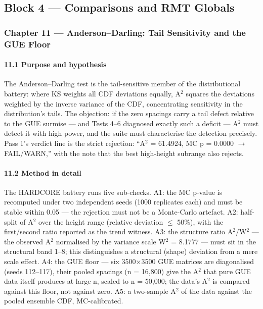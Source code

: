 \documentclass[10pt]{article}
\begin{document}
\subsection{Block 4 --- Comparisons and RMT Globals}

\subsubsection{Chapter 11 --- Anderson--Darling: Tail Sensitivity and the GUE Floor}

\paragraph{11.1 Purpose and hypothesis}

The Anderson--Darling test is the tail-sensitive member of the distributional battery: where KS weights all CDF deviations equally, A$^2$ squares the deviations weighted by the inverse variance of the CDF, concentrating sensitivity in the distribution's tails. The objection: if the zero spacings carry a tail defect relative to the GUE surmise --- and Tests 4--6 diagnosed exactly such a deficit --- A$^2$ must detect it with high power, and the suite must characterise the detection precisely. Pass 1's verdict line is the strict rejection: ``A$^2$ = 61.4924, MC p = 0.0000 $\rightarrow$ FAIL/WARN,'' with the note that the best high-height subrange also rejects.

\paragraph{11.2 Method in detail}

The HARDCORE battery runs five sub-checks. A1: the MC p-value is recomputed under two independent seeds (1000 replicates each) and must be stable within 0.05 --- the rejection must not be a Monte-Carlo artefact. A2: half-split of A$^2$ over the height range (relative deviation $\le$ 50\%), with the first/second ratio reported as the trend witness. A3: the structure ratio A$^2$/W$^2$ --- the observed A$^2$ normalised by the variance scale W$^2$ = 8.1777 --- must sit in the structural band 1--8; this distinguishes a structural (shape) deviation from a mere scale effect. A4: the GUE floor --- six 3500$\times$3500 GUE matrices are diagonalised (seeds 112--117), their pooled spacings (n = 16,800) give the A$^2$ that pure GUE data itself produces at large n, scaled to n = 50,000; the data's A$^2$ is compared against this floor, not against zero. A5: a two-sample A$^2$ of the data against the pooled ensemble CDF, MC-calibrated.
\end{document}
